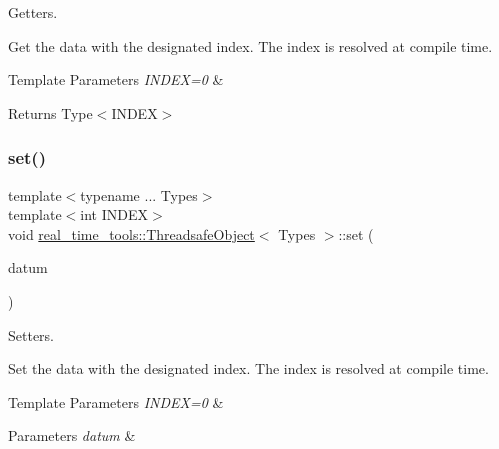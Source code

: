 Getters. 

Get the data with the designated index. The index is resolved at compile time.


\begin{DoxyTemplParams}{Template Parameters}
{\em I\+N\+D\+E\+X=0} & \\
\hline
\end{DoxyTemplParams}
\begin{DoxyReturn}{Returns}
Type$<$\+I\+N\+D\+E\+X$>$ 
\end{DoxyReturn}
\mbox{\label{classreal__time__tools_1_1ThreadsafeObject_af77c2b97547459cf1a1e73c72cecd2a9}} 
\subsubsection{\texorpdfstring{set()}{set()}\hspace{0.1cm}{\footnotesize\ttfamily [1/2]}}
{\footnotesize\ttfamily template$<$typename ... Types$>$ \\
template$<$int I\+N\+D\+EX$>$ \\
void \hyperlink{classreal__time__tools_1_1ThreadsafeObject}{real\+\_\+time\+\_\+tools\+::\+Threadsafe\+Object}$<$ Types $>$\+::set (\begin{DoxyParamCaption}\item[{\hyperlink{classreal__time__tools_1_1ThreadsafeObject}{Threadsafe\+Object}$<$ Types ... $>$\+::\hyperlink{classreal__time__tools_1_1ThreadsafeObject_afcbd77df1964d4fe606f1e776f1ff9b8}{Type}$<$ I\+N\+D\+EX $>$}]{datum }\end{DoxyParamCaption})}



Setters. 

Set the data with the designated index. The index is resolved at compile time.


\begin{DoxyTemplParams}{Template Parameters}
{\em I\+N\+D\+E\+X=0} & \\
\hline
\end{DoxyTemplParams}

\begin{DoxyParams}{Parameters}
{\em datum} & \\
\hline
\end{DoxyParams}
\mbox{\label{classreal__time__tools_1_1ThreadsafeObject_a57fe7089b589f905a13127c50ceb2dae}} 
